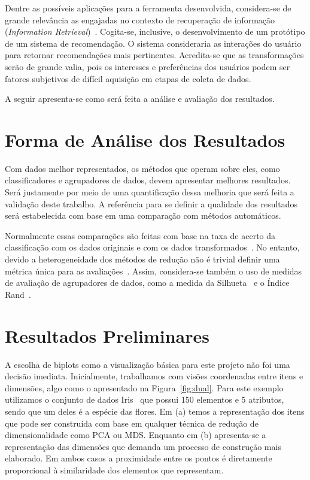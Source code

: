 Dentre as possíveis aplicações para a ferramenta
desenvolvida, considera-se de grande relevância as
engajadas no contexto de recuperação de informação
(\emph{Information Retrieval})~\cite{Manning2008}.
Cogita-se, inclusive, o desenvolvimento de um protótipo de um
sistema de recomendação. O sistema consideraria
as interações do usuário para retornar recomendações mais
pertinentes. Acredita-se que as transformações serão de
grande valia, pois os interesses e preferências dos usuários
podem ser fatores subjetivos de difícil aquisição em etapas
de coleta de dados.

A seguir apresenta-se como será feita a análise e avaliação
dos resultados.

\section{Forma de Análise dos Resultados}

Com dados melhor representados, os métodos que operam sobre
eles, como classificadores e agrupadores de dados, devem
apresentar melhores resultados. Será justamente por meio de uma
quantificação dessa melhoria que será feita a validação 
deste trabalho. A referência para se definir a qualidade dos
resultados será estabelecida com base em uma comparação com
métodos automáticos.

Normalmente essas comparações são feitas com base na taxa de
acerto da classificação com os dados originais e com os
dados transformados~\cite{Guyon2003,Joshi2007}. No entanto,
devido a heterogeneidade dos métodos de redução não é
trivial definir uma métrica única para as
avaliações~\cite{Medeiros2011}. Assim, considera-se também o
uso de medidas de avaliação de agrupadores de dados, como a
medida da Silhueta~\cite{Rousseeuw1987} e o Índice
Rand~\cite{Rand1971}.

\section{Resultados Preliminares}

A escolha de biplots como a visualização básica para este
projeto não foi uma decisão imediata. Inicialmente,
trabalhamos com visões coordenadas entre itens e
dimensões, algo como o apresentado na Figura~\ref{fig:dual}.
Para este exemplo utilizamos o conjunto de dados
Iris~\cite{Fisher1936} que possui 150 elementos e 5
atributos, sendo que um deles é a espécie das flores. Em
(a) temos a representação dos itens que pode ser construída
com base em qualquer técnica de redução de dimensionalidade
como PCA ou MDS. Enquanto em (b) apresenta-se a representação das
dimensões que demanda um processo de construção mais
elaborado. Em ambos casos a proximidade entre os
pontos é diretamente proporcional à similaridade dos
elementos que representam.

